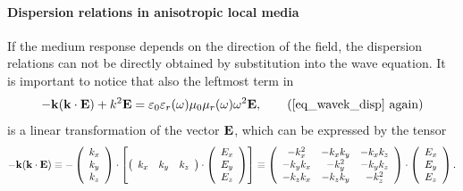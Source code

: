 \paragraph{Dispersion relations in anisotropic local media}  %
If the medium response depends on the direction of the field, the dispersion relations can not be directly obtained by substitution into the wave equation. 
It is important to notice that also the leftmost term in 
\begin{equation} - \kk (\kk \cdot \E) + k^2 \E = \varepsilon_0 \epsrl(\omega) \mu_0 \murl(\omega) \omega^{2} \E, \tag{\ref{eq_wavek_disp} \again} \end{equation}
is a linear transformation of the vector $\mathbf{E}$, which can be expressed by the tensor
$$ - {\mathbf{k}} ({\mathbf{k}} \cdot \mathbf{E}) \equiv 
	-\left(\begin{array}{c} k_x \\ k_y \\ k_z \end{array} \right) \cdot
	\left[\left(\begin{array}{ccc} k_x & k_y & k_z \end{array} \right) \cdot
	\left(\begin{array}{c} E_x \\ E_y \\ E_z \end{array} \right)\right] 
		\equiv
	\left(\begin{array}{ccc} -k_x^2 & -k_x k_y & -k_x k_z \\ -k_y k_x & -k_y^2 & -k_y k_z \\ -k_z k_x & -k_z k_y & -k_z^2 \end{array} \right) \cdot  
	\left(\begin{array}{c} E_x \\ E_y \\ E_z \end{array} \right).
	$$
